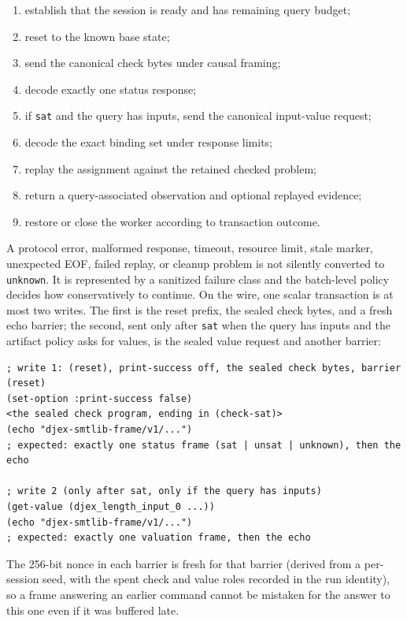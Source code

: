 \documentclass[10pt,letterpaper,oneside]{report}
\newcommand{\sat}{\texttt{sat}}
\newcommand{\unknown}{\texttt{unknown}}
\begin{document}
\begin{enumerate}
\item establish that the session is ready and has remaining query budget;
\item reset to the known base state;
\item send the canonical check bytes under causal framing;
\item decode exactly one status response;
\item if \sat{} and the query has inputs, send the canonical input-value request;
\item decode the exact binding set under response limits;
\item replay the assignment against the retained checked problem;
\item return a query-associated observation and optional replayed evidence;
\item restore or close the worker according to transaction outcome.
\end{enumerate}

A protocol error, malformed response, timeout, resource limit, stale marker, unexpected EOF, failed replay, or cleanup problem is not silently converted to \unknown. It is represented by a sanitized failure class and the batch-level policy decides how conservatively to continue.
On the wire, one scalar transaction is at most two writes. The first is the reset prefix, the sealed check bytes, and a fresh echo barrier; the second, sent only after \sat{} when the query has inputs and the artifact policy asks for values, is the sealed value request and another barrier:

\begin{lstlisting}[language=SMTLib,caption={The two writes of one query transaction (barrier nonces abbreviated).}]
; write 1: (reset), print-success off, the sealed check bytes, barrier
(reset)
(set-option :print-success false)
<the sealed check program, ending in (check-sat)>
(echo "djex-smtlib-frame/v1/...")
; expected: exactly one status frame (sat | unsat | unknown), then the echo

; write 2 (only after sat, only if the query has inputs)
(get-value (djex_length_input_0 ...))
(echo "djex-smtlib-frame/v1/...")
; expected: exactly one valuation frame, then the echo
\end{lstlisting}

The 256-bit nonce in each barrier is fresh for that barrier (derived from a per-session seed, with the spent check and value roles recorded in the run identity), so a frame answering an earlier command cannot be mistaken for the answer to this one even if it was buffered late.
\end{document}

